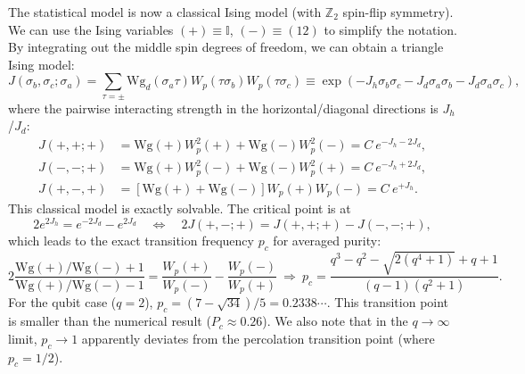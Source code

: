 \documentclass{SciPost}
\begin{document}
The statistical model is now a classical Ising model (with $\mathbb Z_2$ spin-flip symmetry).
We can use the Ising variables $(+) \equiv \mathbb I$, $(-) \equiv (12)$ to simplify the notation.
By integrating out the middle spin degrees of freedom, we can obtain a triangle Ising model:
\begin{equation}
	J\left(\sigma_b, \sigma_c ; \sigma_a\right)
	= \sum_{\tau=\pm} \mathrm{Wg}_d\left(\sigma_a \tau\right) W_p(\tau\sigma_b) W_p(\tau\sigma_c)
	\equiv \exp\left(-J_h\sigma_b\sigma_c-J_d \sigma_a\sigma_b-J_d \sigma_a\sigma_c\right),
\end{equation}
where the pairwise interacting strength in the horizontal/diagonal directions is $J_h$/$J_d$:
\begin{equation}
\begin{aligned}
	J(+,+;+) &= \mathrm{Wg}(+) W^2_p(+) + \mathrm{Wg}(-) W^2_p(-) = C\ e^{-J_h-2J_d}, \\
	J(-,-;+) &= \mathrm{Wg}(+) W^2_p(-) + \mathrm{Wg}(-) W^2_p(+) = C\ e^{-J_h+2J_d}, \\
	J(+,-,+) &= \left[\mathrm{Wg}(+) + \mathrm{Wg}(-)\right] W_p(+) W_p(-) = C\ e^{+J_h}.
\end{aligned}
\end{equation}
This classical model is exactly solvable.
The critical point is at
\begin{equation}
	2 e^{2J_h} = e^{-2J_d} - e^{2J_d}
	\quad \Longleftrightarrow \quad
	2J(+,-;+) = J(+,+;+) - J(-,-;+),
\end{equation}
which leads to the exact transition frequency $p_c$ for averaged purity:
\begin{equation}
	2\frac{\mathrm{Wg}(+)/\mathrm{Wg}(-)+1}{\mathrm{Wg}(+)/\mathrm{Wg}(-)-1} = \frac{W_p(+)}{W_p(-)} - \frac{W_p(-)}{W_p(+)} 
	\ \Longrightarrow \
	p_c = \frac{q^3-q^2-\sqrt{2(q^4+1)}+q+1}{(q-1) \left(q^2+1\right)}.
\end{equation}
For the qubit case ($q=2$), $p_c = (7-\sqrt{34})/5 = 0.2338\cdots$.
This transition point is smaller than the numerical result ($P_c\approx 0.26$).
We also note that in the $q\rightarrow \infty$ limit, $p_c \rightarrow 1$ apparently deviates from the percolation transition point (where $p_c=1/2$).
\end{document}
